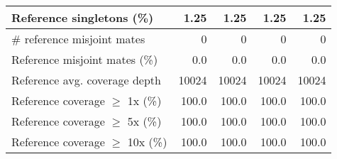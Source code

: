 \documentclass[12pt,a4paper]{article}
\begin{document}
\begin{table}[ht]
\begin{center}
\begin{tabular}{|l*{4}{|r}|}
Reference singletons (\%) & 1.25 & 1.25 & 1.25 & 1.25 \\ \hline
\# reference misjoint mates & 0 & 0 & 0 & 0 \\ \hline
Reference misjoint mates (\%) & 0.0 & 0.0 & 0.0 & 0.0 \\ \hline
Reference avg. coverage depth & 10024 & 10024 & 10024 & 10024 \\ \hline
Reference coverage $\geq$ 1x (\%) & 100.0 & 100.0 & 100.0 & 100.0 \\ \hline
Reference coverage $\geq$ 5x (\%) & 100.0 & 100.0 & 100.0 & 100.0 \\ \hline
Reference coverage $\geq$ 10x (\%) & 100.0 & 100.0 & 100.0 & 100.0 \\ \hline
\end{tabular}
\end{center}
\end{table}
\end{document}
